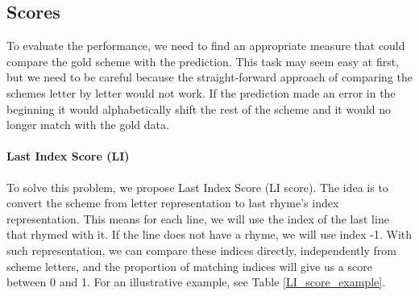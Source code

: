 \subsection{Scores}
To evaluate the performance, we need to find an appropriate measure that could compare the gold scheme with the prediction. This task may seem easy at first, but we need to be careful because the straight-forward approach of comparing the schemes letter by letter would not work. If the prediction made an error in the beginning it would alphabetically shift the rest of the scheme and it would no longer match with the gold data.

\paragraph{Last Index Score (LI)} To solve this problem, we propose Last Index Score (LI score). The idea is to convert the scheme from letter representation to last rhyme's index representation. This means for each line, we will use the index of the last line that rhymed with it. If the line does not have a rhyme, we will use index -1. With such representation, we can compare these indices directly, independently from scheme letters, and the proportion of matching indices will give us a score between 0 and 1. For an illustrative example, see Table \ref{LI_score_example}.


